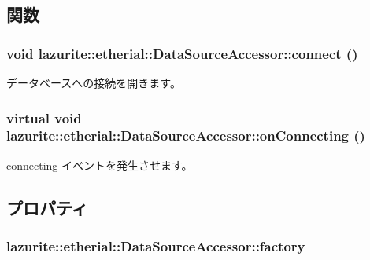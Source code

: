 \subsection{関数}
\hypertarget{classlazurite_1_1etherial_1_1_data_source_accessor_ab685463c590d00380580edb7e62b5078}{
\subsubsection[{connect}]{\setlength{\rightskip}{0pt plus 5cm}void lazurite::etherial::DataSourceAccessor::connect ()}}
\label{classlazurite_1_1etherial_1_1_data_source_accessor_ab685463c590d00380580edb7e62b5078}


データベースへの接続を開きます。 \hypertarget{classlazurite_1_1etherial_1_1_data_source_accessor_a794da7d3f1232feea4dc00ff25ebe93a}{
\subsubsection[{onConnecting}]{\setlength{\rightskip}{0pt plus 5cm}virtual void lazurite::etherial::DataSourceAccessor::onConnecting ()}}
\label{classlazurite_1_1etherial_1_1_data_source_accessor_a794da7d3f1232feea4dc00ff25ebe93a}


connecting イベントを発生させます。 

\subsection{プロパティ}
\hypertarget{classlazurite_1_1etherial_1_1_data_source_accessor_a4832023d76c7928dda2f4a10f2e533cb}{
\subsubsection[{factory}]{ lazurite::etherial::DataSourceAccessor::factory}}
\label{classlazurite_1_1etherial_1_1_data_source_accessor_a4832023d76c7928dda2f4a10f2e533cb}


